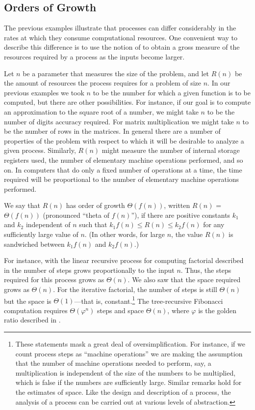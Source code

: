 \subsection{Orders of Growth}
\label{Section 1.2.3}

The previous examples illustrate that processes can differ considerably in the
rates at which they consume computational resources.  One convenient way to
describe this difference is to use the notion of  to
obtain a gross measure of the resources required by a process as the inputs
become larger.

Let \( n \) be a parameter that measures the size of the problem, and let
\( R(n) \) be the amount of resources the process requires for a problem of
size \( n \).  In our previous examples we took \( n \) to be the number for which
a given function is to be computed, but there are other possibilities.  For
instance, if our goal is to compute an approximation to the square root of a
number, we might take \( n \) to be the number of digits accuracy required.  For
matrix multiplication we might take \( n \) to be the number of rows in the
matrices.  In general there are a number of properties of the problem with
respect to which it will be desirable to analyze a given process.  Similarly,
\( R(n) \) might measure the number of internal storage registers used, the
number of elementary machine operations performed, and so on.  In computers
that do only a fixed number of operations at a time, the time required will be
proportional to the number of elementary machine operations performed.

We say that \( R(n) \) has order of growth \( \Theta(f(n)) \), written
\( R(n) \) = \( \Theta(f(n)) \) (pronounced ``theta of
\( f(n) \)''), if there are positive constants \( k_1 \) and \( k_2 \)
independent of \( n \) such that \( k_1f(n) \le R(n) \le k_2f(n) \)
for any sufficiently large value of \( n \).  (In other words, for large \( n \),
the value \( R(n) \) is sandwiched between \( k_1f(n) \) and
\( k_2f(n) \).)

For instance, with the linear recursive process for computing factorial
described in  the number of steps grows proportionally to
the input \( n \).  Thus, the steps required for this process grows as
\( \Theta(n) \).  We also saw that the space required grows as
\( \Theta(n) \).  For the iterative factorial, the number of steps is still
\( \Theta(n) \) but the space is \( \Theta(1) \)---that is,
constant.\footnote{These statements mask a great deal of oversimplification.
For instance, if we count process steps as ``machine operations'' we are making
the assumption that the number of machine operations needed to perform, say, a
multiplication is independent of the size of the numbers to be multiplied,
which is false if the numbers are sufficiently large.  Similar remarks hold for
the estimates of space.  Like the design and description of a process, the
analysis of a process can be carried out at various levels of abstraction.} The
tree-recursive Fibonacci computation requires \( \Theta(\varphi^n) \)
steps and space \( \Theta(n) \), where \( \varphi \) is the golden ratio
described in .

